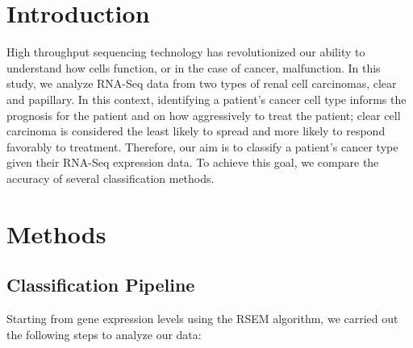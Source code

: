 \section{Introduction}

High throughput sequencing technology has revolutionized our ability to
understand how cells function, or in the case of cancer, malfunction. In this
study, we analyze RNA-Seq data from two types of renal cell carcinomas, clear and papillary. 
In this context, identifying a patient's cancer cell type informs the prognosis for the patient
and on how aggressively to treat the patient; clear cell carcinoma is considered the least likely to spread
and more likely to respond favorably to treatment. Therefore, our aim is to classify a patient's cancer type 
given their RNA-Seq expression data. To achieve this goal, we compare the accuracy of 
several classification methods.


\section{Methods}
\subsection{Classification Pipeline}

Starting from gene expression levels using the RSEM algorithm, we carried out
the following steps to analyze our data:

